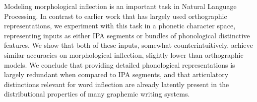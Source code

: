 Modeling morphological inflection is an important task in Natural Language Processing. In contrast to earlier work that has largely used orthographic representations, we experiment with this task in a phonetic character space, representing inputs as either IPA segments or bundles of phonological distinctive features. We show that both of these inputs, somewhat counterintuitively, achieve similar accuracies on morphological inflection, slightly lower than orthographic models. We conclude that providing detailed phonological representations is largely redundant when compared to IPA segments, and that articulatory distinctions relevant for word inflection are already latently present in the distributional properties of many graphemic writing systems.

